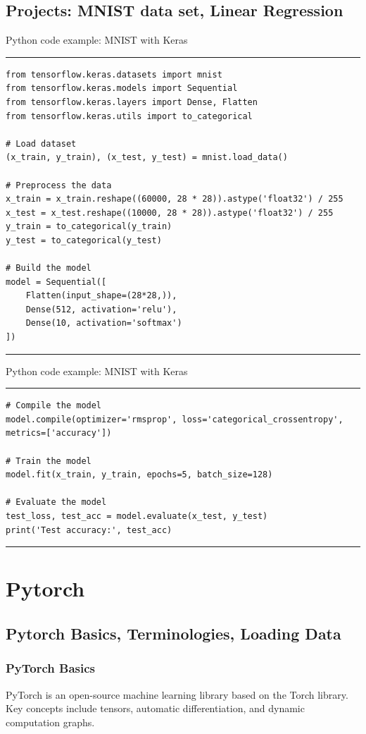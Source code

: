 \documentclass[aspectratio=169, hideothersubsections]{beamer}
\begin{document}
\subsection{Projects: MNIST data set, Linear Regression}
\begin{frame}[fragile]{Python code example: MNIST with Keras}
\rule{\textwidth}{1pt}
\scriptsize
\begin{verbatim}
from tensorflow.keras.datasets import mnist
from tensorflow.keras.models import Sequential
from tensorflow.keras.layers import Dense, Flatten
from tensorflow.keras.utils import to_categorical

# Load dataset
(x_train, y_train), (x_test, y_test) = mnist.load_data()

# Preprocess the data
x_train = x_train.reshape((60000, 28 * 28)).astype('float32') / 255
x_test = x_test.reshape((10000, 28 * 28)).astype('float32') / 255
y_train = to_categorical(y_train)
y_test = to_categorical(y_test)

# Build the model
model = Sequential([
    Flatten(input_shape=(28*28,)),
    Dense(512, activation='relu'),
    Dense(10, activation='softmax')
])
\end{verbatim}
\rule{\textwidth}{1pt}
\end{frame}

\begin{frame}[fragile]{Python code example: MNIST with Keras}
\rule{\textwidth}{1pt}
\scriptsize
\begin{verbatim}
# Compile the model
model.compile(optimizer='rmsprop', loss='categorical_crossentropy', metrics=['accuracy'])

# Train the model
model.fit(x_train, y_train, epochs=5, batch_size=128)

# Evaluate the model
test_loss, test_acc = model.evaluate(x_test, y_test)
print('Test accuracy:', test_acc)
\end{verbatim}
\rule{\textwidth}{1pt}
\end{frame}

\section{Pytorch}

\subsection{Pytorch Basics, Terminologies, Loading Data}
\begin{frame}
\frametitle{PyTorch Basics}
PyTorch is an open-source machine learning library based on the Torch library. Key concepts include tensors, automatic differentiation, and dynamic computation graphs.
\end{frame}
\end{document}
